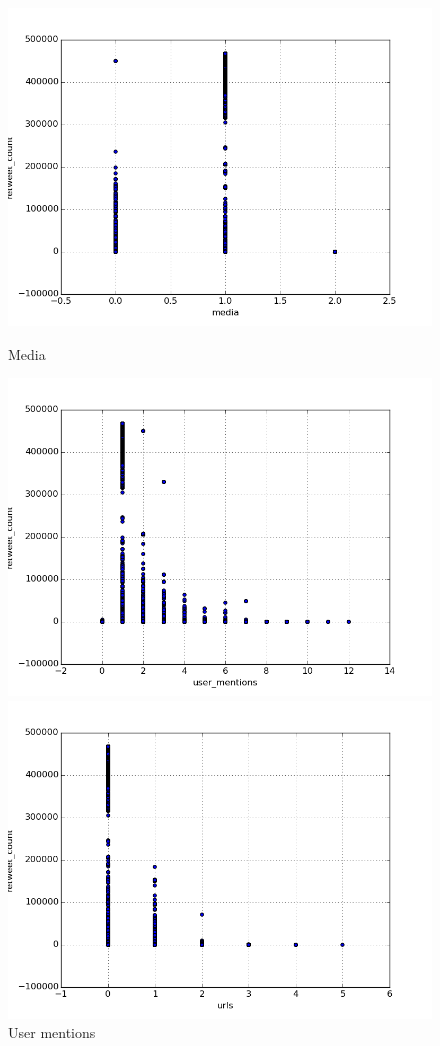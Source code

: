 \begin{figure}[H]
    \centering
    \includegraphics[width=\linewidth]{img/media.png}
    \caption{Media}
\endminipage\hfill
{}
    \centering
    \includegraphics[width=\linewidth]{img/user_mentions.png}
    \caption{User mentions}
\endminipage\hfill
{}
    \centering
    \includegraphics[width=\linewidth]{img/urls.png}

\end{figure}
